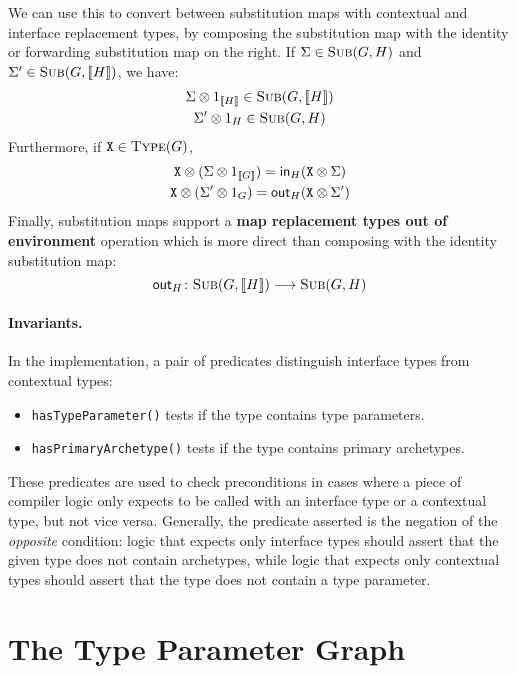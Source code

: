 \documentclass[../generics]{subfiles}
\begin{document}
We can use this to convert between substitution maps with contextual and interface replacement types, by composing the substitution map with the identity or forwarding substitution map on the right. If $\Sigma\in\textsc{Sub}({G, H})$ and $\Sigma^\prime\in\textsc{Sub}({G, [\![H]\!]})$, we have:
\begin{gather*}
\Sigma\otimes 1_{[\![H]\!]}\in\textsc{Sub}({G, [\![H]\!]})\\
\Sigma^\prime\otimes 1_H\in\textsc{Sub}({G, H})
\end{gather*}
Furthermore, if $\texttt{X}\in\textsc{Type}({G})$,
\begin{gather*}
\texttt{X}\otimes (\Sigma\otimes 1_{[\![G]\!]}) = \mathsf{in}_{H}(\texttt{X} \otimes \Sigma)\\
\texttt{X}\otimes (\Sigma^\prime \otimes 1_G) = \mathsf{out}_{H}(\texttt{X} \otimes \Sigma^\prime)
\end{gather*}
Finally, substitution maps support a \textbf{map replacement types out of environment} operation which is more direct than composing with the identity substitution map:
\[\mathsf{out}_H\colon\textsc{Sub}({G, [\![H]\!]})\longrightarrow\textsc{Sub}({G, H})\]

\paragraph{Invariants.} In the implementation, a pair of predicates distinguish interface types from contextual types:
\begin{itemize}
\item \texttt{hasTypeParameter()} tests if the type contains type parameters.
\item \texttt{hasPrimaryArchetype()} tests if the type contains primary archetypes.
\end{itemize}
These predicates are used to check preconditions in cases where a piece of compiler logic only expects to be called with an interface type or a contextual type, but not vice versa. Generally, the predicate asserted is the negation of the \emph{opposite} condition: logic that expects only interface types should assert that the given type does not contain archetypes, while logic that expects only contextual types should assert that the type does not contain a type parameter.

\section{The Type Parameter Graph}\label{type parameter graph}
\end{document}
